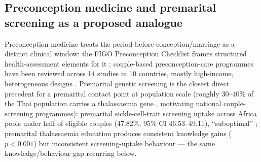 \documentclass[11pt]{article}
\begin{document}
\subsection{Preconception medicine and premarital screening as a proposed analogue}
Preconception medicine treats the period before conception/marriage as a distinct clinical window: the FIGO Preconception Checklist frames structured health-assessment elements for it \cite{ref11}; couple-based preconception-care programmes have been reviewed across 14 studies in 10 countries, mostly high-income, heterogeneous designs \cite{ref32}. Premarital genetic screening is the closest direct precedent for a premarital contact point at population scale (roughly 30--40\% of the Thai population carries a thalassaemia gene \cite{ref117}, motivating national couple-screening programmes): premarital sickle-cell-trait screening uptake across Africa pools under half of eligible couples (47.82\%, 95\% CI 46.53--49.11), ``suboptimal'' \cite{ref12}; premarital thalassaemia education produces consistent knowledge gains ($p<0.001$) but inconsistent screening-uptake behaviour \cite{ref13} --- the same knowledge/behaviour gap recurring below.
\end{document}
